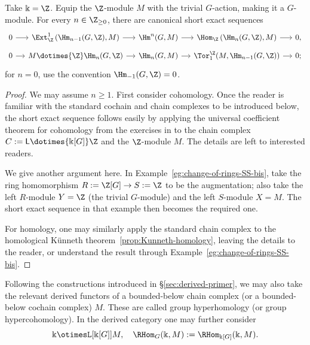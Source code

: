 \begin{proposition}\label{prop:group-UCT}
	Take $\Bbbk=\Z$. Equip the $\Z$-module $M$ with the trivial $G$-action,
	making it a $G$-module. For every $n\in\Z_{\geq0}$, there are canonical
	short exact sequences
	\[\begin{tikzcd}[row sep=tiny, column sep=small]
		0 \arrow[r] & \Ext^1_{\Z}\left( \Hm_{n-1}(G, \Z), M \right) \arrow[r] & \Hm^n(G, M) \arrow[r] & \Hom_{\Z}\left( \Hm_n(G, \Z), M \right) \arrow[r] & 0, \\
		0 \arrow[r] & M \dotimes{\Z} \Hm_n(G, \Z) \arrow[r] & \Hm_n(G, M) \arrow[r] & \Tor^{\Z}_1(M, \Hm_{n-1}(G, \Z)) \arrow[r] & 0;
	\end{tikzcd}\]
	for $n=0$, use the convention $\Hm_{-1}(G,\Z)=0$.
\end{proposition}
\begin{proof}
	We may assume $n\geq1$. First consider cohomology. Once the reader is
	familiar with the standard cochain and chain complexes to be introduced
	below, the short exact sequence follows easily by applying the universal
	coefficient theorem for cohomology from the exercises in 
	to the chain complex $C:=\mathsf{L}\dotimes{\Bbbk[G]}\Z$ and the
	$\Z$-module $M$. The details are left to interested readers.

	We give another argument here. In Example~\ref{eg:change-of-rings-SS-bis},
	take the ring homomorphism $R:=\Z[G]\to S:=\Z$ to be the augmentation;
	also take the left $R$-module $Y=\Z$ (the trivial $G$-module) and the left
	$S$-module $X=M$. The short exact sequence in that example then becomes
	the required one.

	For homology, one may similarly apply the standard chain complex to the
	homological K\"unneth theorem~\ref{prop:Kunneth-homology}, leaving the
	details to the reader, or understand the result through
	Example~\ref{eg:change-of-rings-SS-bis}.
\end{proof}

Following the constructions introduced in \S\ref{sec:derived-primer}, we may
also take the relevant derived functors of a bounded-below chain complex (or a
bounded-below cochain complex) $M$. These are called group hyperhomology (or
group hypercohomology). In the derived category one may further consider
\[ \Bbbk \otimesL[{\Bbbk[G]}] M, \quad \RHom_G(\Bbbk, M) := \RHom_{\Bbbk[G]}(\Bbbk, M). \]


